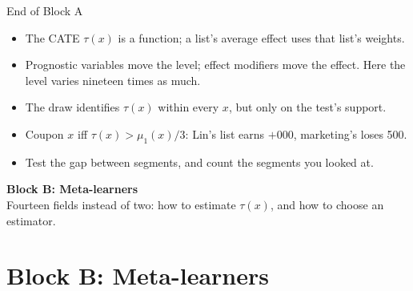 \documentclass[aspectratio=169, 11pt, handout]{beamer}
\begin{document}
\begin{frame}{End of Block A}

\begin{itemize}
  \item The CATE $\tau(x)$ is a function; a list's average effect uses that list's weights.
  \item Prognostic variables move the level; effect modifiers move the effect. Here the level varies nineteen times as much.
  \item The draw identifies $\tau(x)$ within every $x$, but only on the test's support.
  \item Coupon $x$ iff $\tau(x) > \mu_1(x)/3$: Lin's list earns $+$000, marketing's loses 500.
  \item Test the gap between segments, and count the segments you looked at.
\end{itemize}

\vfill

\begin{center}
\Large \textbf{Block B: Meta-learners}\\[0.4em]
\normalsize Fourteen fields instead of two: how to estimate $\tau(x)$, and how to choose an estimator.
\end{center}
\vfill
\end{frame}

\section{Block B: Meta-learners}
\end{document}
